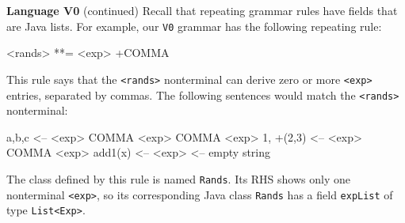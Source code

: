 \begin{minipage}[t]{\sw}
\slidenumber
\LARGE
{\bf Language V0} (continued)\exx
Recall that repeating grammar rules
have fields that are Java lists.
For example, our \verb'V0' grammar has the following repeating rule:
\begin{qv}
<rands> **= <exp> +COMMA
\end{qv}
This rule says that the \verb'<rands>' nonterminal
can derive zero or more \verb'<exp>' entries,
separated by commas.
The following sentences would match the \verb'<rands>' nonterminal:
\begin{qv}
a,b,c     <-- <exp> COMMA <exp> COMMA <exp>
1, +(2,3) <-- <exp> COMMA <exp>
add1(x)   <-- <exp>
          <-- empty string
\end{qv}
The class defined by this rule is named \verb'Rands'.
Its RHS shows only one nonterminal \verb'<exp>',
so its corresponding Java class \verb'Rands'
has a field \verb'expList' of type \verb'List<Exp>'.\exx
\end{minipage}
